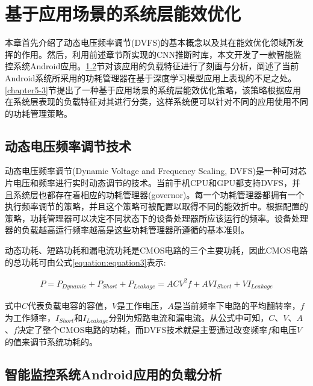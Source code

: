 \chapter{基于应用场景的系统层能效优化}
\label{chapter:chapter5}
本章首先介绍了动态电压频率调节(DVFS)的基本概念以及其在能效优化领域所发挥的作用。然后，利用前述章节所实现的CNN推断时库，本文开发了一款智能监控系统Android应用。\ref{chapter5-2}节对该应用的负载特征进行了刻画与分析，阐述了当前Android系统所采用的功耗管理器在基于深度学习模型应用上表现的不足之处。\ref{chapter5-3}节提出了一种基于应用场景的系统层能效优化策略，该策略根据应用在系统层表现的负载特征对其进行分类，这样系统便可以针对不同的应用使用不同的功耗管理策略。

\section{动态电压频率调节技术}

动态电压频率调节(Dynamic Voltage and Frequency Scaling, DVFS)是一种可对芯片电压和频率进行实时动态调节的技术。当前手机CPU和GPU都支持DVFS，并且系统层也都存在着相应的功耗管理器(governor)。每一个功耗管理器都拥有一个执行频率调节的策略，并且这个策略可被配置以取得不同的能效折中。根据配置的策略，功耗管理器可以决定不同状态下的设备处理器所应该运行的频率。设备处理器的负载越高运行频率越高是这些功耗管理器所遵循的基本准则。

动态功耗\cite{benini1999policy}、短路功耗\cite{周宽久2010嵌入式软硬件低功耗优化研究综述倡}和漏电流功耗\cite{you2006compilers}是CMOS电路的三个主要功耗，因此CMOS电路的总功耗可由公式\ref{equation:equation3}表示:

\begin{equation}
     \label{equation:equation3}
     \begin{aligned}
        P = P_{Dynamic} + P_{Short} + P_{Leakage}
         = ACV^2f +  AVI_{Short} + VI_{Leakage}
     \end{aligned}
\end{equation}

式中$C$代表负载电容的容值，$V$是工作电压，$A$是当前频率下电路的平均翻转率，$f$为工作频率，$I_{Short}$和$I_{Leakage}$分别为短路电流和漏电流。从公式中可知，$C$、$V$、$A$、$f$决定了整个CMOS电路的功耗，而DVFS技术就是主要通过改变频率$f$和电压$V$的值来调节系统功耗的。


\section{智能监控系统Android应用的负载分析}
\label{chapter5-2}

